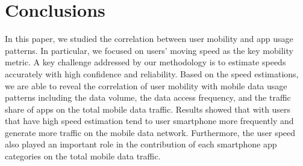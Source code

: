 \section{Conclusions}\label{conclusion}

In this paper, we studied the correlation between user mobility and app usage patterns.
In particular, we focused on users' moving speed as the key mobility metric. 
A key challenge addressed by our methodology is to estimate speeds accurately with high confidence and reliability. 
Based on the speed estimations, we are able to reveal the correlation of user mobility with mobile data usage patterns 
including the data volume, the data access frequency, and the traffic share of apps on the total mobile data traffic. 
Results showed that with users that have high speed estimation tend to user smartphone more frequently and 
generate more traffic on the mobile data network. 
Furthermore, the user speed also played an important role in the contribution of each smartphone app categories on the total mobile data traffic. 